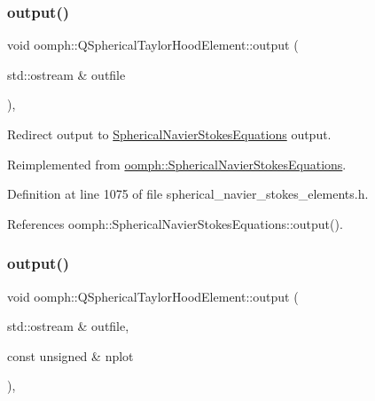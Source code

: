 \subsubsection{\texorpdfstring{output()}{output()}\hspace{0.1cm}{\footnotesize\ttfamily [1/4]}}
{\footnotesize\ttfamily void oomph\+::\+Q\+Spherical\+Taylor\+Hood\+Element\+::output (\begin{DoxyParamCaption}\item[{std\+::ostream \&}]{outfile }\end{DoxyParamCaption})\hspace{0.3cm}{\ttfamily [inline]}, {\ttfamily [virtual]}}



Redirect output to \hyperlink{classoomph_1_1SphericalNavierStokesEquations}{Spherical\+Navier\+Stokes\+Equations} output. 



Reimplemented from \hyperlink{classoomph_1_1SphericalNavierStokesEquations_a1d08588d3d9462de04d447506af5cdd5}{oomph\+::\+Spherical\+Navier\+Stokes\+Equations}.



Definition at line 1075 of file spherical\+\_\+navier\+\_\+stokes\+\_\+elements.\+h.



References oomph\+::\+Spherical\+Navier\+Stokes\+Equations\+::output().

\mbox{\label{classoomph_1_1QSphericalTaylorHoodElement_ac4e26ba768ccacbcd5144d34219690b0}} 
\subsubsection{\texorpdfstring{output()}{output()}\hspace{0.1cm}{\footnotesize\ttfamily [2/4]}}
{\footnotesize\ttfamily void oomph\+::\+Q\+Spherical\+Taylor\+Hood\+Element\+::output (\begin{DoxyParamCaption}\item[{std\+::ostream \&}]{outfile,  }\item[{const unsigned \&}]{nplot }\end{DoxyParamCaption})\hspace{0.3cm}{\ttfamily [inline]}, {\ttfamily [virtual]}}



